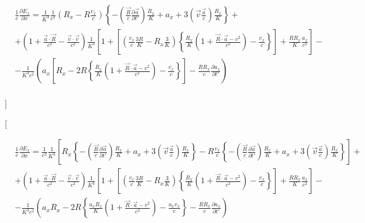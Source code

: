 \documentclass[11pt]{article}
\begin{document}
\begin{align}
  & \frac{1}{e}\frac{\partial {{E}_{x}}}{\partial x}=\frac{1}{{{K}^{3}}}\frac{1}{{{c}^{2}}}\left( {{R}_{x}}-R\frac{{{v}_{x}}}{c} \right)\left\{ -\left( \frac{\overrightarrow{R}}{c}\frac{\partial \overrightarrow{a}}{\partial t'} \right)\frac{{{R}_{x}}}{K}+{{a}_{x}}+3\left( \overrightarrow{v}\frac{\overrightarrow{a}}{c} \right)\frac{{{R}_{x}}}{K} \right\}+ \\ 
 & +\left( 1+\frac{\overrightarrow{a}\cdot \overrightarrow{R}}{{{c}^{2}}}-\frac{\overrightarrow{v}\cdot \overrightarrow{v}}{{{c}^{2}}} \right)\frac{1}{{{K}^{3}}}\left[ 1+\left[ \left( \frac{{{v}_{x}}}{c}\frac{3R}{K}-{{R}_{x}}\frac{3}{K} \right)\left\{ \frac{{{R}_{x}}}{K}\left( 1+\frac{\overrightarrow{R}\cdot \overrightarrow{a}-{{v}^{2}}}{{{c}^{2}}} \right)-\frac{{{v}_{x}}}{c} \right\} \right]+\frac{R{{R}_{x}}}{K}\frac{{{a}_{x}}}{{{c}^{2}}} \right]- \\ 
 & -\frac{1}{{{K}^{3}}{{c}^{2}}}\left( {{a}_{x}}\left[ {{R}_{x}}-2R\left\{ \frac{{{R}_{x}}}{K}\left( 1+\frac{\overrightarrow{R}\cdot \overrightarrow{a}-{{v}^{2}}}{{{c}^{2}}} \right)-\frac{{{v}_{x}}}{c} \right\} \right]-\frac{R{{R}_{x}}}{c}\frac{\partial {{a}_{x}}}{\partial t'} \right) \\ 
\end{align}

{]}

{[}

\begin{align}
  & \frac{1}{e}\frac{\partial {{E}_{x}}}{\partial x}=\frac{1}{{{c}^{2}}}\frac{1}{{{K}^{3}}}\left[ {{R}_{x}}\left\{ -\left( \frac{\overrightarrow{R}}{c}\frac{\partial \overrightarrow{a}}{\partial t'} \right)\frac{{{R}_{x}}}{K}+{{a}_{x}}+3\left( \overrightarrow{v}\frac{\overrightarrow{a}}{c} \right)\frac{{{R}_{x}}}{K} \right\}-R\frac{{{v}_{x}}}{c}\left\{ -\left( \frac{\overrightarrow{R}}{c}\frac{\partial \overrightarrow{a}}{\partial t'} \right)\frac{{{R}_{x}}}{K}+{{a}_{x}}+3\left( \overrightarrow{v}\frac{\overrightarrow{a}}{c} \right)\frac{{{R}_{x}}}{K} \right\} \right]+ \\ 
 & +\left( 1+\frac{\overrightarrow{a}\cdot \overrightarrow{R}}{{{c}^{2}}}-\frac{\overrightarrow{v}\cdot \overrightarrow{v}}{{{c}^{2}}} \right)\frac{1}{{{K}^{3}}}\left[ 1+\left[ \left( \frac{{{v}_{x}}}{c}\frac{3R}{K}-{{R}_{x}}\frac{3}{K} \right)\left\{ \frac{{{R}_{x}}}{K}\left( 1+\frac{\overrightarrow{R}\cdot \overrightarrow{a}-{{v}^{2}}}{{{c}^{2}}} \right)-\frac{{{v}_{x}}}{c} \right\} \right]+\frac{R{{R}_{x}}}{K}\frac{{{a}_{x}}}{{{c}^{2}}} \right]- \\ 
 & -\frac{1}{{{K}^{3}}{{c}^{2}}}\left( {{a}_{x}}{{R}_{x}}-2R\left\{ \frac{{{a}_{x}}{{R}_{x}}}{K}\left( 1+\frac{\overrightarrow{R}\cdot \overrightarrow{a}-{{v}^{2}}}{{{c}^{2}}} \right)-\frac{{{a}_{x}}{{v}_{x}}}{c} \right\}-\frac{R{{R}_{x}}}{c}\frac{\partial {{a}_{x}}}{\partial t'} \right) \\ 
\end{align}
\end{document}
